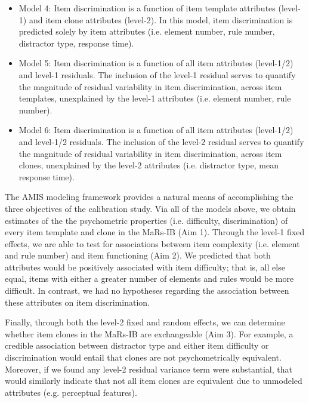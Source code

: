 \documentclass[a4paper,man,natbib]{apa6}
\begin{document}
\begin{itemize}

    \item Model 4: Item discrimination is a function of item template attributes (level-1) and item clone attributes (level-2). In this model, item discrimination is predicted solely by item attributes (i.e. element number, rule number, distractor type, response time). 
    
    \item Model 5: Item discrimination is a function of all item attributes (level-1/2) and level-1 residuals. The inclusion of the level-1 residual serves to quantify the magnitude of residual variability in item discrimination, across item templates, unexplained by the level-1 attributes (i.e. element number, rule number).
    
    \item Model 6: Item discrimination is a function of all item attributes (level-1/2) and level-1/2 residuals. The inclusion of the level-2 residual serves to quantify the magnitude of residual variability in item discrimination, across item clones, unexplained by the level-2 attributes (i.e. distractor type, mean response time).
    
\end{itemize}

The AMIS modeling framework provides a natural means of accomplishing the three objectives of the calibration study. Via all of the models above, we obtain estimates of the the psychometric properties (i.e. difficulty, discrimination) of every item template and clone in the MaRs-IB (Aim 1). Through the level-1 fixed effects, we are able to test for associations between item complexity (i.e. element and rule number) and item functioning (Aim 2). We predicted that both attributes would be positively associated with item difficulty; that is, all else equal, items with either a greater number of elements and rules would be more difficult. In contrast, we had no hypotheses regarding the association between these attributes on item discrimination. 

Finally, through both the level-2 fixed and random effects, we can determine whether item clones in the MaRs-IB are exchangeable (Aim 3). For example, a credible association between distractor type and either item difficulty or discrimination would entail that clones are not psychometrically equivalent. Moreover, if we found any level-2 residual variance term were substantial, that would similarly indicate that not all item clones are equivalent due to unmodeled attributes (e.g. perceptual features).
\end{document}
